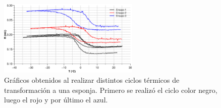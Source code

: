 \documentclass[a4paper,12pt,fleqn,twoside,openany]{book}
\begin{document}
 \begin{figure}[h]
 \centering
 \includegraphics[width=0.6\textwidth]{Img/Resultados/Resistencia/RED_resultados.eps}
 \caption{Gráficos obtenidos al realizar distintos ciclos térmicos de transformación a una esponja. Primero se realizó el ciclo color negro, luego el rojo y por último el azul.} 
 \label{fig:RED_resultados}
 \end{figure}
 
\end{document}
